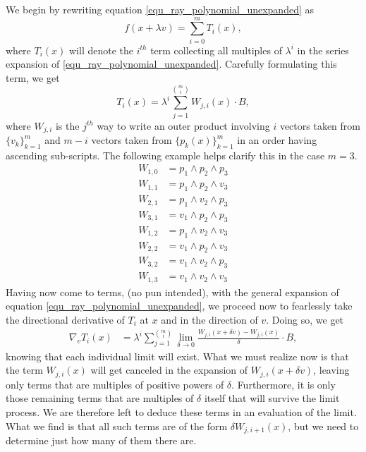\documentclass{birkjour}
\theoremstyle{definition}
\theoremstyle{remark}
\numberwithin{equation}{section}
\begin{document}
We begin by rewriting equation \eqref{equ_ray_polynomial_unexpanded} as
\begin{equation}\label{equ_ray_polynomial_expanded_but_unknown}
f(x+\lambda v) = \sum_{i=0}^m T_i(x),
\end{equation}
where $T_i(x)$ will denote the $i^{th}$ term collecting all multiples of
$\lambda^i$ in the series expansion of
\eqref{equ_ray_polynomial_unexpanded}.  Carefully formulating this term, we get
\begin{equation*}
T_i(x) = \lambda^i \sum_{j=1}^{\binom{m}{i}} W_{j,i}(x)\cdot B,
\end{equation*}
where $W_{j,i}$ is the $j^{th}$ way to write an outer product involving
$i$ vectors taken from $\{v_k\}_{k=1}^m$ and $m-i$ vectors taken from
$\{p_k(x)\}_{k=1}^m$ in an order having ascending sub-scripts.  The following
example helps clarify this in the case $m=3$.
\begin{align*}
W_{1,0} &= p_1\wedge p_2\wedge p_3 \\
W_{1,1} &= p_1\wedge p_2\wedge v_3 \\
W_{2,1} &= p_1\wedge v_2\wedge p_3 \\
W_{3,1} &= v_1\wedge p_2\wedge p_3 \\
W_{1,2} &= p_1\wedge v_2\wedge v_3 \\
W_{2,2} &= v_1\wedge p_2\wedge v_3 \\
W_{3,2} &= v_1\wedge v_2\wedge p_3 \\
W_{1,3} &= v_1\wedge v_2\wedge v_3
\end{align*}
Having now come to terms, (no pun intended), with the general expansion of
equation \eqref{equ_ray_polynomial_unexpanded}, we proceed now to
fearlessly take the directional derivative of $T_i$ at $x$ and in the direction of $v$.
Doing so, we get
\begin{align*}
\nabla_v T_i(x) &= \lambda^i\sum_{j=1}^{\binom{m}{i}}\lim_{\delta\to 0}
\frac{W_{j,i}(x+\delta v)-W_{j,i}(x)}{\delta}\cdot B,
\end{align*}
knowing that each individual limit will exist.  What we must realize now is that
the term $W_{j,i}(x)$ will get canceled in the expansion
of $W_{j,i}(x+\delta v)$, leaving only terms that are multiples of positive powers of $\delta$.
Furthermore, it is only those remaining terms that are multiples of $\delta$ itself
that will survive the limit process.  We are therefore left to deduce these terms in an
evaluation of the limit.  What we find is that all such terms are of the form
$\delta W_{j,i+1}(x)$, but we need to determine just how many of them there are.
\end{document}
